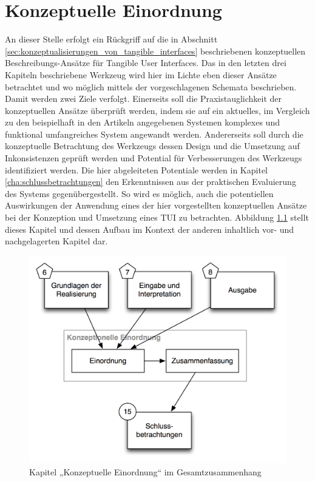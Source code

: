 
\chapter{Konzeptuelle Einordnung} %
\label{cha:konzeptuelle_evaluierung}

An dieser Stelle erfolgt ein Rückgriff auf die in Abschnitt \ref{sec:konzeptualisierungen_von_tangible_interfaces} beschriebenen konzeptuellen Beschreibungs-Ansätze für Tangible User Interfaces. Das in den letzten drei Kapiteln beschriebene Werkzeug wird hier im Lichte eben dieser Ansätze betrachtet und wo möglich mittels der vorgeschlagenen Schemata beschrieben. Damit werden zwei Ziele verfolgt. Einerseits soll die Praxistauglichkeit der konzeptuellen Ansätze überprüft werden, indem sie auf ein aktuelles, im Vergleich zu den beispielhaft in den Artikeln angegebenen Systemen komplexes und funktional umfangreiches System angewandt werden. Andererseits soll durch die konzeptuelle Betrachtung des Werkzeugs dessen Design und die Umsetzung auf Inkonsistenzen geprüft werden und Potential für Verbesserungen des Werkzeugs identifiziert werden. Die hier abgeleiteten Potentiale werden in Kapitel \ref{cha:schlussbetrachtungen} den Erkenntnissen aus der praktischen Evaluierung des Systems gegenübergestellt. So wird es möglich, auch die potentiellen Auswirkungen der Anwendung eines der hier vorgestellten konzeptuellen Ansätze bei der Konzeption und Umsetzung eines \gls{TUI} zu betrachten. Abbildung \ref{fig:img_Kontextgrafiken_k10} stellt dieses Kapitel und dessen Aufbau im Kontext der anderen inhaltlich vor- und nachgelagerten Kapitel dar.


\begin{figure}[htbp]
	\centering
		\includegraphics[scale=0.6]{img/Kontextgrafiken/k10.png}
	\caption{Kapitel „Konzeptuelle Einordnung“ im Gesamtzusammenhang}
	\label{fig:img_Kontextgrafiken_k10}
\end{figure}

